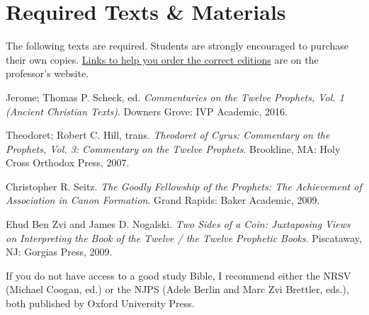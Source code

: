 \documentclass[titlepage]{article}
\newcommand\incl{../includes}
\begin{document}


%

\section{Required Texts \& Materials}
\label{texts}

The following texts are required. Students are strongly encouraged to
purchase their own copies. \href{http://danieldriver.com/courses/hb-3114/#required-texts-winter-2018}{Links to help you order the correct editions} are on the professor's website.

\begingroup
\renewcommand{\section}[2]{}%
\begin{thebibliography}{Theodoret}%

	 Jerome; Thomas P. Scheck, ed.
	\emph{Commentaries on the Twelve Prophets, Vol. 1 (Ancient Christian Texts)}.
	Downers Grove: IVP Academic, 2016.

	 Theodoret; Robert C. Hill, trans.
	\emph{Theodoret of Cyrus: Commentary on the Prophets, Vol. 3: Commentary on the Twelve Prophets}.
	Brookline, MA: Holy Cross Orthodox Press, 2007.

	 Christopher R. Seitz.
	\emph{The Goodly Fellowship of the Prophets: The Achievement of Association in Canon Formation}.
	Grand Rapids: Baker Academic, 2009.

	 Ehud Ben Zvi and James D. Nogalski.
	\emph{Two Sides of a Coin: Juxtaposing Views on Interpreting the Book of the Twelve / the Twelve Prophetic Books}.
	Piscataway, NJ: Gorgias Press, 2009.

\end{thebibliography}
\endgroup

If you do not have access to a good study Bible, I recommend either the
NRSV (Michael Coogan, ed.) or the NJPS (Adele Berlin and Marc Zvi
Brettler, eds.), both published by Oxford University Press.
\end{document}
